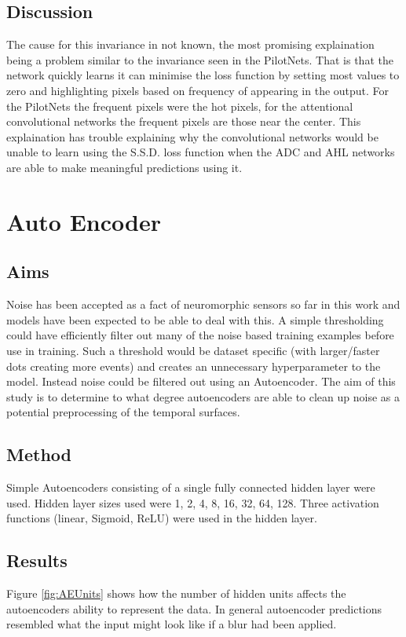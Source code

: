 \subsection{Discussion}
The cause for this invariance in not known, the most promising explaination being a problem similar to the invariance seen in the PilotNets.
That is that the network quickly learns it can minimise the loss function by setting most values to zero and highlighting pixels based on frequency of appearing in the output.
For the PilotNets the frequent pixels were the hot pixels, for the attentional convolutional networks the frequent pixels are those near the center.
This explaination has trouble explaining why the convolutional networks would be unable to learn using the S.S.D. loss function when the ADC and AHL networks are able to make meaningful predictions using it.  

\section{Auto Encoder}
\subsection{Aims}
Noise has been accepted as a fact of neuromorphic sensors so far in this work and models have been expected to be able to deal with this.
A simple thresholding could have efficiently filter out many of the noise based training examples before use in training. 
Such a threshold would be dataset specific (with larger/faster dots creating more events) and creates an unnecessary hyperparameter to the model. 
Instead noise could be filtered out using an Autoencoder.
The aim of this study is to determine to what degree autoencoders are able to clean up noise as a potential preprocessing of the temporal surfaces.

\subsection{Method}
Simple Autoencoders consisting of a single fully connected hidden layer were used.
Hidden layer sizes used were 1, 2, 4, 8, 16, 32, 64, 128. 
Three activation functions (linear, Sigmoid, ReLU) were used in the hidden layer.   

\subsection{Results}
Figure \ref{fig:AEUnits} shows how the number of hidden units affects the autoencoders ability to represent the data. 
In general autoencoder predictions resembled what the input might look like if a blur had been applied. 

